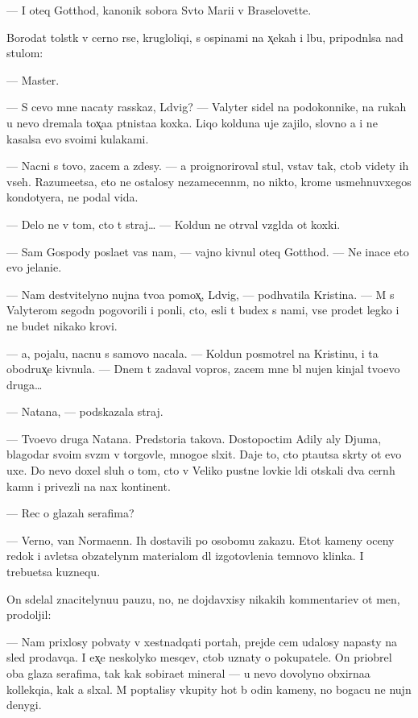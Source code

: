 \documentclass[10pt]{book}
\begin{document}
— I oteq Gotthod, kanonik sobora Sv{\ia}to{\y} Mari{\y}i v Braselovette.

Borodat{\yi}{\y} tolst{\ia}k v cerno{\y} r{\ia}se, krugloliqi{\y}, s ospinami na x̨ekah i lbu, pripodn{\ia}lsa nad stulom:

— Master.

— S cevo mne nacaty rasskaz, L{\iu}dvig? — Valyter sidel na podokonnike, na rukah u nevo dremala tox̨a{\y}a p{\ia}tnista{\y}a koxka. Liqo kolduna uje zajilo, slovno {\y}a i ne kasalsa {\y}evo svo{\y}imi kulakami.

— Nacni s tovo, zacem {\y}a zdesy. — {\Y}a pro{\y}ignoriroval stul, vstav tak, ctob{\yi} videty ih vseh. Razume{\y}etsa, eto ne ostalosy nezamecenn{\yi}m, no nikto, krome usmehnuvxegos{\ia} kondotyera, ne podal vida.

— Delo ne v tom, cto t{\yi} straj… — Koldun ne otr{\yi}val vzgl{\ia}da ot koxki.

— Sam Gospody pos{\yi}la{\y}et vas nam, — vajno kivnul oteq Gotthod. — Ne inace eto {\y}evo jelani{\y}e.

— Nam de{\y}stvitelyno nujna tvo{\y}a pomox̨, L{\iu}dvig, — podhvatila Kristina. — M{\yi} s Valyterom segodn{\ia} pogovorili i pon{\ia}li, cto, {\y}esli t{\yi} budex s nami, vse pro{\y}det legko i ne budet nikako{\y} krovi.

— {\Y}a, pojalu{\y}, nacnu s samovo nacala. — Koldun posmotrel na Kristinu, i ta obodr{\ia}{\y}ux̨e kivnula. — Dnem t{\yi} zadaval vopros, zacem mne b{\yi}l nujen kinjal tvo{\y}evo druga…

— Natana, — podskazala straj.

— Tvo{\y}evo druga Natana. Pred{\yi}stori{\y}a takova. Dostopoctim{\yi}{\y} Adily aly Djuma, blagodar{\ia} svo{\y}im sv{\ia}z{\ia}m v torgovle, mnogo{\y}e sl{\yi}xit. Daje to, cto p{\yi}ta{\y}utsa skr{\yi}ty ot {\y}evo uxe{\y}. Do nevo doxel sluh o tom, cto v Veliko{\y} pust{\yi}ne lovki{\y}e l{\iu}di ot{\yi}skali dva cern{\yi}h kamn{\ia} i privezli na nax kontinent.

— Rec o glazah serafima?

— Verno, van Norma{\y}enn. Ih dostavili po osobomu zakazu. Etot kameny oceny redok i {\y}avl{\ia}{\y}etsa ob{\ia}zatelyn{\yi}m materialom dl{\ia} izgotovleni{\y}a temnovo klinka. I trebu{\y}etsa kuznequ.

On sdelal znacitelynu{\y}u pauzu, no, ne dojdavxisy nikakih kommentari{\y}ev ot men{\ia}, prodoljil:

— Nam prixlosy pob{\yi}vaty v xestnadqati portah, prejde cem udalosy napasty na sled prodavqa. I {\y}ex̨e neskolyko mes{\ia}qev, ctob{\yi} uznaty o pokupatele. On priobrel oba glaza serafima, tak kak sobira{\y}et mineral{\yi} — u nevo dovolyno obxirna{\y}a kollekqi{\y}a, kak {\y}a sl{\yi}xal. M{\yi} pop{\yi}talisy v{\yi}kupity hot{\ia} b{\yi} odin kameny, no bogacu ne nujn{\yi} denygi.
\end{document}

